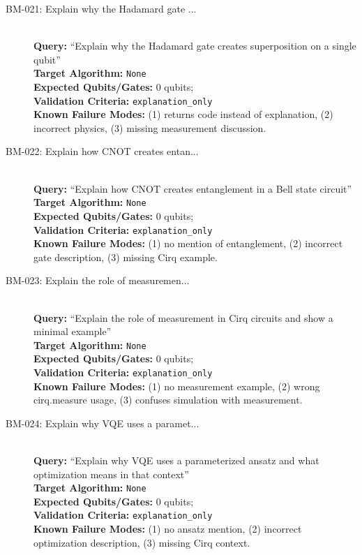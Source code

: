 \begin{description}
    \item[BM-021: Explain why the Hadamard gate ...] \ \\
    \textbf{Query:} ``Explain why the Hadamard gate creates superposition on a single qubit'' \\
    \textbf{Target Algorithm:} \texttt{None} \\
    \textbf{Expected Qubits/Gates:} 0 qubits; \texttt{} \\
    \textbf{Validation Criteria:} \texttt{explanation\_only} \\
    \textbf{Known Failure Modes:} (1) returns code instead of explanation, (2) incorrect physics, (3) missing measurement discussion.

    \item[BM-022: Explain how CNOT creates entan...] \ \\
    \textbf{Query:} ``Explain how CNOT creates entanglement in a Bell state circuit'' \\
    \textbf{Target Algorithm:} \texttt{None} \\
    \textbf{Expected Qubits/Gates:} 0 qubits; \texttt{} \\
    \textbf{Validation Criteria:} \texttt{explanation\_only} \\
    \textbf{Known Failure Modes:} (1) no mention of entanglement, (2) incorrect gate description, (3) missing Cirq example.

    \item[BM-023: Explain the role of measuremen...] \ \\
    \textbf{Query:} ``Explain the role of measurement in Cirq circuits and show a minimal example'' \\
    \textbf{Target Algorithm:} \texttt{None} \\
    \textbf{Expected Qubits/Gates:} 0 qubits; \texttt{} \\
    \textbf{Validation Criteria:} \texttt{explanation\_only} \\
    \textbf{Known Failure Modes:} (1) no measurement example, (2) wrong cirq.measure usage, (3) confuses simulation with measurement.

    \item[BM-024: Explain why VQE uses a paramet...] \ \\
    \textbf{Query:} ``Explain why VQE uses a parameterized ansatz and what optimization means in that context'' \\
    \textbf{Target Algorithm:} \texttt{None} \\
    \textbf{Expected Qubits/Gates:} 0 qubits; \texttt{} \\
    \textbf{Validation Criteria:} \texttt{explanation\_only} \\
    \textbf{Known Failure Modes:} (1) no ansatz mention, (2) incorrect optimization description, (3) missing Cirq context.


\end{description}
